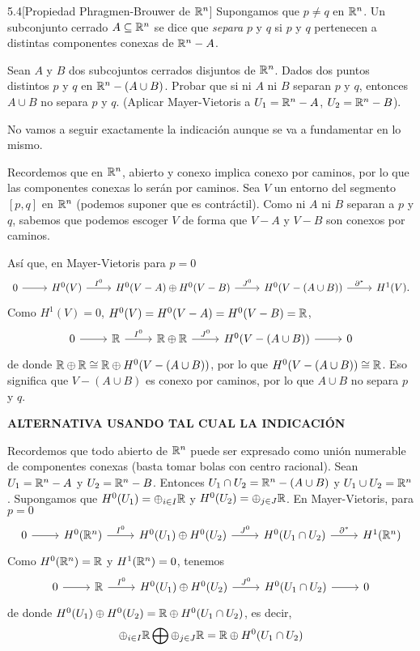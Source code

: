 \documentclass[twoside]{article}
\begin{document}
\begin{ejercicio}{5.4}[Propiedad Phragmen-Brouwer de $\mathbb{R}^n$]  Supongamos que $p\neq q$ en $\mathbb{R}^n$. Un subconjunto cerrado $A\subseteq\mathbb{R}^n$ se dice que \emph{separa} $p$ y $q$ si $p$ y $q$ pertenecen a distintas componentes conexas de $\mathbb{R}^n-A$. 

Sean $A$ y $B$ dos subcojuntos cerrados disjuntos de $\mathbb{R}^n$. Dados dos puntos distintos $p$ y $q$ en $\mathbb{R}^n-(A\cup B)$. Probar que si ni $A$ ni $B$ separan $p$ y $q$, entonces $A\cup B$ no separa $p$ y $q$. (Aplicar Mayer-Vietoris a $U_1=\mathbb{R}^n-A$, $U_2=\mathbb{R}^n-B$).

\end{ejercicio}
\begin{solucion}
No vamos a seguir exactamente la indicación aunque se va a fundamentar en lo mismo.

Recordemos que en $\mathbb{R}^n$, abierto y conexo implica conexo por caminos, por lo que las componentes conexas lo serán por caminos. Sea $V$ un entorno del segmento $[p,q]$ en $\mathbb{R}^n$ (podemos suponer que es contráctil). Como ni $A$ ni $B$ separan a $p$ y $q$, sabemos que podemos escoger $V$ de forma que $V-A$ y $V-B$ son conexos por caminos. 

Así que, en Mayer-Vietoris para $p=0$
\[
\begin{tikzcd}
0\arrow[r] & H^0(V)\arrow[r,"I^0"] & H^0(V-A)\oplus H^0(V-B)\arrow[r, "J^0"] & H^0(V-(A\cup B))\arrow[r,"\partial^*"] & H^1(V).
\end{tikzcd}
\]
Como $H^1(V)=0$, $H^0(V)=H^0(V-A)=H^0(V-B)=\mathbb{R}$,
\[
\begin{tikzcd}
0\arrow[r] & \R\arrow[r,"I^0"] & \R\oplus \R\arrow[r, "J^0"] & H^0(V-(A\cup B))\arrow[r]& 0
\end{tikzcd}
\]
de donde $\mathbb{R}\oplus\mathbb{R}\cong \mathbb{R}\oplus  H^0(V-(A\cup B))$, por lo que $H^0(V-(A\cup B))\cong\mathbb{R}$. Eso significa que $V-(A\cup B)$ es conexo por caminos, por lo que $A\cup B$ no separa $p$ y $q$. 

{\bf\large ALTERNATIVA USANDO TAL CUAL LA INDICACIÓN}

Recordemos que todo abierto de $\mathbb{R}^n$ puede ser expresado como unión numerable de componentes conexas (basta tomar bolas con centro racional). Sean $U_1=\mathbb{R}^n-A$ y $U_2=\mathbb{R}^n-B$. Entonces $U_1\cap U_2=\mathbb{R}^n-(A\cup B)$ y $U_1\cup U_2=\mathbb{R}^n$. Supongamos que $H^0(U_1)=\oplus_{i\in I}\mathbb{R}$ y $H^0(U_2)=\oplus_{j\in J}\mathbb{R}$. En Mayer-Vietoris, para $p=0$
\[
\begin{tikzcd}
0\arrow[r] & H^0(\R^n)\arrow[r,"I^0"] & H^0(U_1)\oplus H^0(U_2)\arrow[r, "J^0"] & H^0(U_1\cap U_2)\arrow[r,"\partial^*"] & H^1(\R^n)
\end{tikzcd}
\]
Como $H^0(\mathbb{R}^n)=\mathbb{R}$ y $H^1(\mathbb{R}^n)=0$, tenemos
\[
\begin{tikzcd}
0\arrow[r] & \R \arrow[r,"I^0"] & H^0(U_1)\oplus H^0(U_2)\arrow[r, "J^0"] & H^0(U_1\cap U_2)\arrow[r] & 0
\end{tikzcd}
\]
de donde $ H^0(U_1)\oplus H^0(U_2)=\mathbb{R}\oplus H^0(U_1\cap U_2)$, es decir,
\[
\oplus_{i\in I}\mathbb{R}\bigoplus \oplus_{j\in J}\mathbb{R} =\mathbb{R}\oplus H^0(U_1\cap U_2)
\]
\end{solucion}
\end{document}
